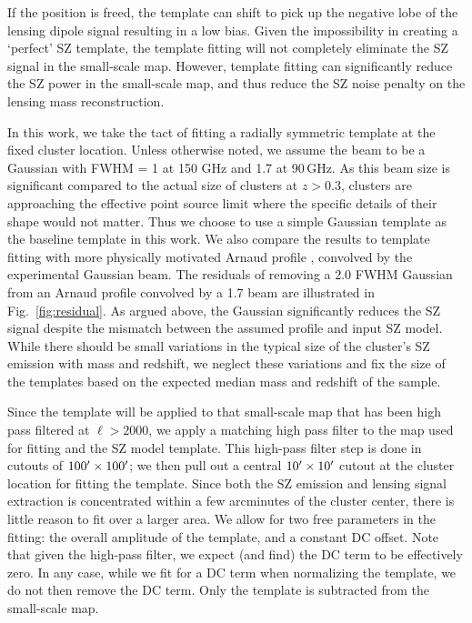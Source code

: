 If the position is freed, the template can shift to pick up the negative lobe of the lensing dipole signal resulting in a low bias. 
Given the impossibility in creating a `perfect' SZ template, the template fitting will not completely eliminate the SZ signal in the small-scale map. 
However, template fitting can significantly reduce the SZ power in the small-scale map, and thus reduce the SZ noise penalty on the lensing mass reconstruction. 

In this work, we take the tact of fitting a radially symmetric template at the fixed cluster location. 
Unless otherwise noted, we assume the beam to be a Gaussian with FWHM = 1\arcmin{} at 150 GHz and 1\arcmin.7 at 90\,GHz. 
As this beam size is significant compared to the actual size of clusters at $z>0.3$, clusters are approaching the effective point source limit where the specific details of their shape would not matter. 
Thus we choose to use a simple Gaussian template as the baseline template in this work. 
We also compare the results to template fitting with more physically motivated Arnaud profile \citep{arnaud10}, convolved by the experimental Gaussian beam.  
The residuals of removing a 2\arcmin.0 FWHM Gaussian from an Arnaud profile convolved by a 1\arcmin.7 beam are illustrated in Fig.~\ref{fig:residual}. 
As argued above, the Gaussian significantly reduces the SZ signal despite the mismatch between the assumed profile and input SZ model. 
While there should be small variations in the typical size of the cluster's SZ emission with mass and redshift, we neglect these variations and fix the size of the templates based on the expected median mass and redshift of the sample.

Since the template will be applied to that small-scale map that has been high pass filtered at $\ell > 2000$, we apply a matching high pass filter to the map used for fitting and the SZ model template. 
This high-pass filter step is done in cutouts of $100^{\prime} \times 100^{\prime}$; we then pull out a central $10^{\prime} \times 10^{\prime}$ cutout at the cluster location for fitting the template. 
Since both the SZ emission and lensing signal extraction is concentrated within a few arcminutes of the cluster center, there is little reason to fit over a larger area. 
We allow for two free parameters in the fitting: the overall amplitude of the template, and a constant DC offset. 
Note that given the high-pass filter, we expect (and find) the DC term to be effectively zero. 
In any case, while we fit for a DC term when normalizing the template, we do not then remove the DC term. 
Only the template is subtracted from the small-scale map.

